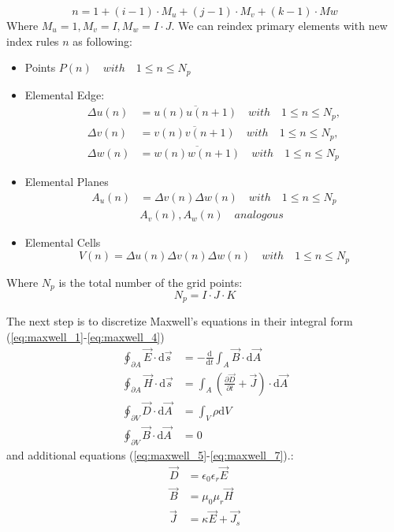 \begin{equation}
n=1+(i-1)\cdot M_{u}+(j-1)\cdot M_{v}+(k-1)\cdot M{w}
\label{eq:discrete_index}
\end{equation}
Where $M_{u}=1,M_{v}=I,M_{w}=I\cdot J$. We can reindex primary elements with new index rules $n$ as following:
\begin{itemize}
\item Points $P(n) \quad with \quad 1\leq n \leq N_{p}$
\item Elemental Edge:
    \begin{align}
		\Delta u(n)&=\overline{u(n)u(n+1)}  \quad with \quad 1\leq n \leq N_{p}, \nonumber\\
		\Delta v(n)&=\overline{v(n)v(n+1)}  \quad with \quad 1\leq n \leq N_{p}, \nonumber\\
		\Delta w(n)&=\overline{w(n)w(n+1)}  \quad with \quad 1\leq n \leq N_{p}
		\label{eq:discrete_edge_n}
		\end{align}
\item Elemental Planes
		\begin{align}
		A_{u}(n)&=\Delta v(n)\Delta w(n) \quad with \quad 1\leq n\leq N_{p}\nonumber\\
		&A_{v}(n),A_{w}(n)  \quad analogous
		\label{eq:discrete_plane_n}
		\end{align}
\item Elemental Cells
		\begin{equation}
		V(n)=\Delta u(n)\Delta v(n)\Delta w(n)  \quad with \quad 1\leq n\leq N_{p}
		\label{eq:discrete_cell_n}
		\end{equation}
\end{itemize}
Where $N_{p}$ is the total number of the grid points:
\begin{equation}
N_{p}=I\cdot J\cdot K
\label{eq:np}
\end{equation}

The next step is to discretize Maxwell's equations in their integral form (\ref{eq:maxwell_1}-\ref{eq:maxwell_4}) 
\begin{align}
\oint_{\partial A}\vec{E}\cdot\mathrm{d}\vec{s}&=
-\frac{\mathrm{d}}{\mathrm{d}t}\int_{A}\vec{B}\cdot\mathrm{d}\vec{A}
\label{eq:maxwell_1}\\
\oint_{\partial A}\vec{H}\cdot\mathrm{d}\vec{s}&=
\int_{A}(\frac{\partial\vec{D}}{\partial t}+\vec{J})\cdot\mathrm{d}\vec{A}
\label{eq:maxwell_2}\\
\oint_{\partial V}\vec{D}\cdot\mathrm{d}\vec{A}&=
\int_{V}\rho\mathrm{d}V
\label{eq:maxwell_3}\\
\oint_{\partial V}\vec{B}\cdot\mathrm{d}\vec{A}&=0
\label{eq:maxwell_4}
\end{align}
and additional equations (\ref{eq:maxwell_5}-\ref{eq:maxwell_7}).:
\begin{align}
\vec{D}&=\epsilon_{0}\epsilon_{r}\vec{E}
\label{eq:maxwell_5}\\
\vec{B}&=\mu_{0}\mu_{r}\vec{H}
\label{eq:maxwell_6}\\
\vec{J}&=\kappa\vec{E}+\vec{J_{s}}
\label{eq:maxwell_7}
\end{align}
